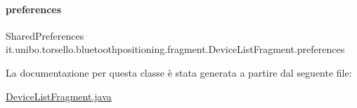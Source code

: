 \hypertarget{classit_1_1unibo_1_1torsello_1_1bluetoothpositioning_1_1fragment_1_1DeviceListFragment_a3f583494281dbe65b3e76c28b5facbe7_a3f583494281dbe65b3e76c28b5facbe7}{}\label{classit_1_1unibo_1_1torsello_1_1bluetoothpositioning_1_1fragment_1_1DeviceListFragment_a3f583494281dbe65b3e76c28b5facbe7_a3f583494281dbe65b3e76c28b5facbe7} 
\paragraph{\texorpdfstring{preferences}{preferences}}
{\footnotesize\ttfamily Shared\+Preferences it.\+unibo.\+torsello.\+bluetoothpositioning.\+fragment.\+Device\+List\+Fragment.\+preferences\hspace{0.3cm}{\ttfamily [private]}}



La documentazione per questa classe è stata generata a partire dal seguente file\+:\begin{DoxyCompactItemize}
\item 
\hyperlink{DeviceListFragment_8java}{Device\+List\+Fragment.\+java}\end{DoxyCompactItemize}
